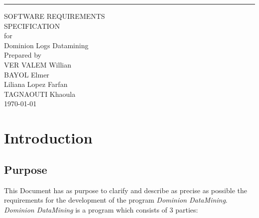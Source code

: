 \documentclass{scrreprt}
\date{}
\begin{document}
\begin{flushright}
    \rule{16cm}{5pt}\vskip1cm
    \begin{bfseries}
        \Huge{SOFTWARE REQUIREMENTS\\ SPECIFICATION}\\
        \vspace{1.9cm}
        for\\
        \vspace{1.9cm}
        Dominion Logs Datamining\\
        \vspace{1.9cm}
        Prepared by \\ VER VALEM Willian \\ BAYOL Elmer \\ Liliana Lopez Farfan
        \\ TAGNAOUTI Khaoula\\
        \vspace{1.9cm}
        \today\\
    \end{bfseries}
\end{flushright}

\tableofcontents




\chapter{Introduction}

\section{Purpose}
This Document has as purpose to clarify and describe as precise as possible the
requirements for the development of the program \textit{Dominion DataMining}.\\
\textit{Dominion DataMining} is a program which consists of 3 parties:
\end{document}
